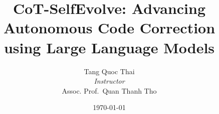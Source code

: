 \usepackage[english]{babel}

\title[Seminar]{
    CoT-SelfEvolve: Advancing Autonomous Code Correction using Large Language Models
}

\author[Tang Quoc Thai]{
Tang Quoc Thai\\[4mm]
{\small \textit{Instructor} \\[1mm]
Assoc. Prof.\ Quan Thanh Tho}}


\date{\today}
